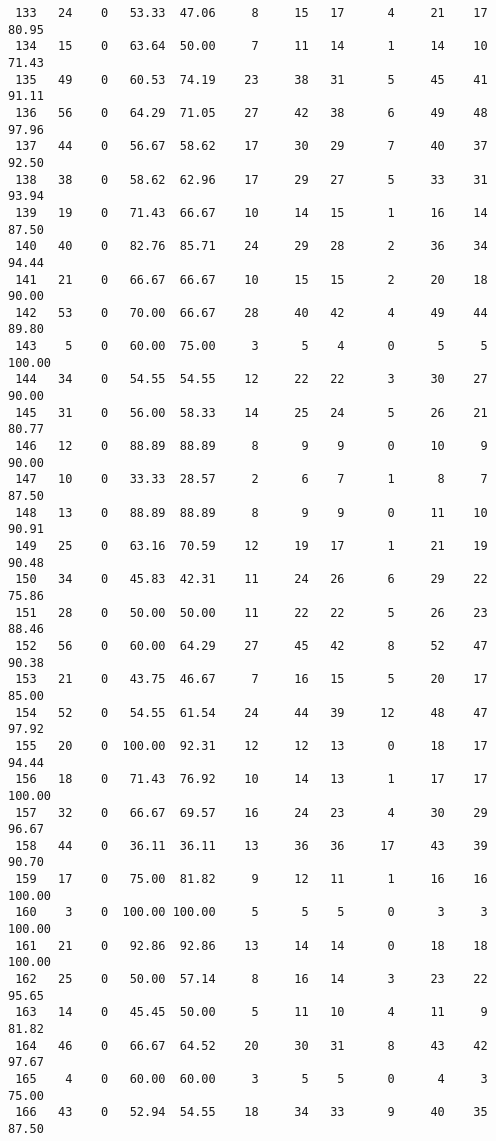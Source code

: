 \begin{verbatim}
 133   24    0   53.33  47.06     8     15   17      4     21    17    80.95
 134   15    0   63.64  50.00     7     11   14      1     14    10    71.43
 135   49    0   60.53  74.19    23     38   31      5     45    41    91.11
 136   56    0   64.29  71.05    27     42   38      6     49    48    97.96
 137   44    0   56.67  58.62    17     30   29      7     40    37    92.50
 138   38    0   58.62  62.96    17     29   27      5     33    31    93.94
 139   19    0   71.43  66.67    10     14   15      1     16    14    87.50
 140   40    0   82.76  85.71    24     29   28      2     36    34    94.44
 141   21    0   66.67  66.67    10     15   15      2     20    18    90.00
 142   53    0   70.00  66.67    28     40   42      4     49    44    89.80
 143    5    0   60.00  75.00     3      5    4      0      5     5   100.00
 144   34    0   54.55  54.55    12     22   22      3     30    27    90.00
 145   31    0   56.00  58.33    14     25   24      5     26    21    80.77
 146   12    0   88.89  88.89     8      9    9      0     10     9    90.00
 147   10    0   33.33  28.57     2      6    7      1      8     7    87.50
 148   13    0   88.89  88.89     8      9    9      0     11    10    90.91
 149   25    0   63.16  70.59    12     19   17      1     21    19    90.48
 150   34    0   45.83  42.31    11     24   26      6     29    22    75.86
 151   28    0   50.00  50.00    11     22   22      5     26    23    88.46
 152   56    0   60.00  64.29    27     45   42      8     52    47    90.38
 153   21    0   43.75  46.67     7     16   15      5     20    17    85.00
 154   52    0   54.55  61.54    24     44   39     12     48    47    97.92
 155   20    0  100.00  92.31    12     12   13      0     18    17    94.44
 156   18    0   71.43  76.92    10     14   13      1     17    17   100.00
 157   32    0   66.67  69.57    16     24   23      4     30    29    96.67
 158   44    0   36.11  36.11    13     36   36     17     43    39    90.70
 159   17    0   75.00  81.82     9     12   11      1     16    16   100.00
 160    3    0  100.00 100.00     5      5    5      0      3     3   100.00
 161   21    0   92.86  92.86    13     14   14      0     18    18   100.00
 162   25    0   50.00  57.14     8     16   14      3     23    22    95.65
 163   14    0   45.45  50.00     5     11   10      4     11     9    81.82
 164   46    0   66.67  64.52    20     30   31      8     43    42    97.67
 165    4    0   60.00  60.00     3      5    5      0      4     3    75.00
 166   43    0   52.94  54.55    18     34   33      9     40    35    87.50

\end{verbatim}
